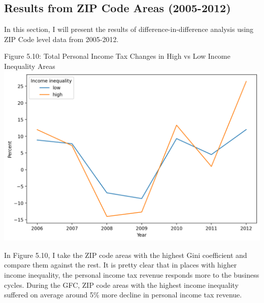 \documentclass{article}
\begin{document}

\pagebreak

\subsection{Results from ZIP Code Areas (2005-2012)}
In this section, I will present the results of difference-in-difference analysis using ZIP Code level data from 2005-2012. 

\begin{center}
Figure 5.10: Total Personal Income Tax Changes in High vs Low Income Inequality Areas
\includegraphics[scale=0.5]{images/high_vs_low_gini.png}
\end{center}

In Figure 5.10, I take the ZIP code areas with the highest Gini coefficient and compare them against the rest. It is pretty clear that in places with higher income inequality, the personal income tax revenue responds more to the business cycles. During the GFC, ZIP code areas with the highest income inequality suffered on average around 5\% more decline in personal income tax revenue. \\
\end{document}
